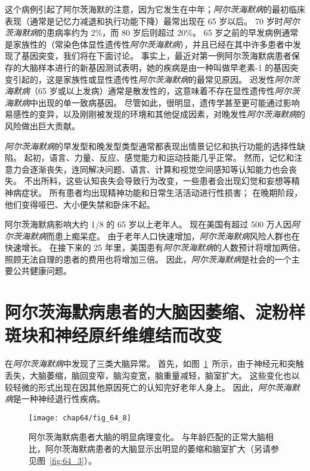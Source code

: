 这个病例引起了阿尔茨海默的注意，因为它发生在中年；\textit{阿尔茨海默病}的最初临床表现（通常是记忆力减退和执行功能下降）最常出现在 65 岁以后。
70 岁时\textit{阿尔茨海默病}的患病率约为 2\%，而 80 岁后则超过 20\%。
65 岁之前的早发病例通常是家族性的（常染色体显性遗传性\textit{阿尔茨海默病}），并且已经在其中许多患者中发现了基因突变，我们将在下面讨论。
事实上，最近对第一例阿尔茨海默病患者保存的大脑样本进行的新基因测试表明，她的疾病是由一种叫做早老素-1 的基因突变引起的，这是家族性或显性遗传性\textit{阿尔茨海默病}的最常见原因。
迟发性\textit{阿尔茨海默病}（65 岁或以上发病）通常是散发性的，这意味着不存在显性遗传性\textit{阿尔茨海默病}中出现的单一致病基因。
尽管如此，很明显，遗传学甚至更可能通过影响易感性的变异，以及刚刚被发现的环境和其他促成因素，对晚发性\textit{阿尔茨海默病}的风险做出巨大贡献。


\textit{阿尔茨海默病}的早发型和晚发型类型通常都表现出情景记忆和执行功能的选择性缺陷。
起初，语言、力量、反应、感觉能力和运动技能几乎正常。
然而，记忆和注意力会逐渐丧失，连同解决问题、语言、计算和视觉空间感知等认知能力也会丧失。
不出所料，这些认知丧失会导致行为改变，一些患者会出现幻觉和妄想等精神病症状。
所有患者均出现精神功能和日常生活活动进行性损害；
在晚期阶段，他们变得哑巴、大小便失禁和卧床不起。


阿尔茨海默病影响大约 1/8 的 65 岁以上老年人。
现在美国有超过 500 万人因\textit{阿尔茨海默病}而患上痴呆症。
由于老年人口快速增加，\textit{阿尔茨海默病}风险人群也在快速增长。
在接下来的 25 年里，美国患有\textit{阿尔茨海默病}的人数预计将增加两倍，照顾无法自理的患者的费用也将增加三倍。
因此，\textit{阿尔茨海默病}是社会的一个主要公共健康问题。



\section{阿尔茨海默病患者的大脑因萎缩、淀粉样斑块和神经原纤维缠结而改变}

在\textit{阿尔茨海默病}中发现了三类大脑异常。
首先，如图~\ref{fig:64_8}~所示，由于神经元和突触丢失，大脑萎缩，脑回变窄，脑沟变宽，脑重量减轻，脑室扩大。
这些变化也以较轻微的形式出现在因其他原因死亡的认知完好老年人身上。
因此，\textit{阿尔茨海默病}是一种神经退行性疾病。


\begin{figure}[htbp]
	\centering
	\texttt{[image: chap64/fig\_64\_8]}
	\caption{阿尔茨海默病患者大脑的明显病理变化。
		与年龄匹配的正常大脑相比，阿尔茨海默病患者的大脑显示出明显的萎缩和脑室扩大（另请参见图~\ref{fig:64_3}）。}
	\label{fig:64_8}
\end{figure}


